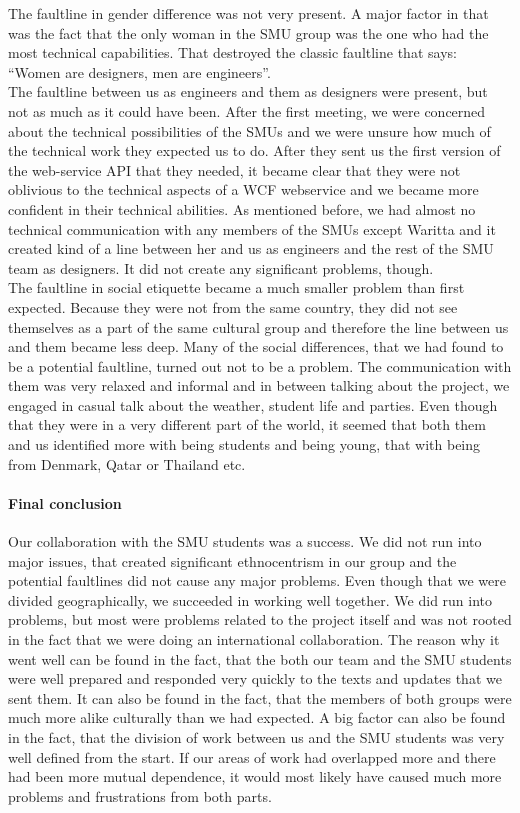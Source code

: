 \documentclass[a4paper,11pt,report]{article}
\begin{document}
The faultline in gender difference was not very present. A major factor in that was the fact that the only woman in the SMU group was the one who had the most technical capabilities. That destroyed the classic faultline that says: “Women are designers, men are engineers”.\\

The faultline between us as engineers and them as designers were present, but not as much as it could have been. After the first meeting, we were concerned about the technical possibilities of the SMUs and we were unsure how much of the technical work they expected us to do. After they sent us the first version of the web-service API that they needed, it became clear that they were not oblivious to the technical aspects of a WCF webservice and we became more confident in their technical abilities. As mentioned before, we had almost no technical communication with any members of the SMUs except Waritta and it created kind of a line between her and us as engineers and the rest of the SMU team as designers. It did not create any significant problems, though. \\

The faultline in social etiquette became a much smaller problem than first expected. Because they were not from the same country, they did not see themselves as a part of the same cultural group and therefore the line between us and them became less deep. Many of the social differences, that we had found to be a potential faultline, turned out not to be a problem. The communication with them was very relaxed and informal and in between talking about the project, we engaged in casual talk about the weather, student life and parties. Even though that they were in a very different part of the world, it seemed that both them and us identified more with being students and being young, that with being from Denmark, Qatar or Thailand etc.\\

\paragraph{Final conclusion}
Our collaboration with the SMU students was a success. We did not run into major issues, that created significant ethnocentrism in our group and the potential faultlines did not cause any major problems. Even though that we were divided geographically, we succeeded in working well together. We did run into problems, but most were problems related to the project itself and was not rooted in the fact that we were doing an international collaboration. The reason why it went well can be found in the fact, that the both our team and the SMU students were well prepared and responded very quickly to the texts and updates that we sent them. It can also be found in the fact, that the members of both groups were much more alike culturally than we had expected. A big factor can also be found in the fact, that the division of work between us and the SMU students was very well defined from the start. If our areas of work had overlapped more and there had been more mutual dependence, it would most likely have caused much more problems and frustrations from both parts. 
\end{document}
